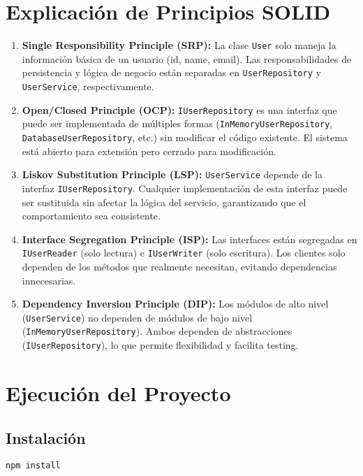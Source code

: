 \documentclass[11pt,a4paper]{article}
\begin{document}
\section{Explicación de Principios SOLID}

\begin{enumerate}
    \item \textbf{Single Responsibility Principle (SRP):} La clase \texttt{User} solo maneja la información básica de un usuario (id, name, email). Las responsabilidades de persistencia y lógica de negocio están separadas en \texttt{UserRepository} y \texttt{UserService}, respectivamente.

    \item \textbf{Open/Closed Principle (OCP):} \texttt{IUserRepository} es una interfaz que puede ser implementada de múltiples formas (\texttt{InMemoryUserRepository}, \texttt{DatabaseUserRepository}, etc.) sin modificar el código existente. El sistema está abierto para extensión pero cerrado para modificación.

    \item \textbf{Liskov Substitution Principle (LSP):} \texttt{UserService} depende de la interfaz \texttt{IUserRepository}. Cualquier implementación de esta interfaz puede ser sustituida sin afectar la lógica del servicio, garantizando que el comportamiento sea consistente.

    \item \textbf{Interface Segregation Principle (ISP):} Las interfaces están segregadas en \texttt{IUserReader} (solo lectura) e \texttt{IUserWriter} (solo escritura). Los clientes solo dependen de los métodos que realmente necesitan, evitando dependencias innecesarias.

    \item \textbf{Dependency Inversion Principle (DIP):} Los módulos de alto nivel (\texttt{UserService}) no dependen de módulos de bajo nivel (\texttt{InMemoryUserRepository}). Ambos dependen de abstracciones (\texttt{IUserRepository}), lo que permite flexibilidad y facilita testing.
\end{enumerate}

\section{Ejecución del Proyecto}

\subsection*{Instalación}
\begin{verbatim}
npm install
\end{verbatim}
\end{document}
